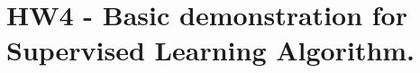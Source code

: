 \chapter{HW4 -\/ Basic demonstration for Supervised Learning Algorithm.}
\hypertarget{md__e_1_2_git_hub_2_p_r_m_l___code_2src_2hw4_2readme}{}\label{md__e_1_2_git_hub_2_p_r_m_l___code_2src_2hw4_2readme}
\label{md__e_1_2_git_hub_2_p_r_m_l___code_2src_2hw4_2readme_autotoc_md10}%
%

